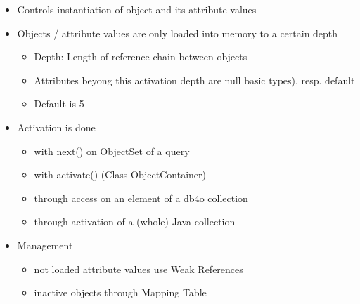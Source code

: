 \begin{breakbox}
\begin{itemize}
	\item Controls instantiation of object and its attribute values
	\item Objects / attribute values are only loaded into memory to a certain depth
		\begin{itemize}
			\item Depth: Length of reference chain between objects
			\item Attributes beyong this activation depth are null basic types), resp. default
			\item Default is 5
		\end{itemize}
	\item Activation is done
		\begin{itemize}
			\item with next() on ObjectSet of a query
			\item with activate() (Class ObjectContainer)
			\item through access on an element of a db4o collection
			\item through activation of a (whole) Java collection
		\end{itemize}
	\item Management
		\begin{itemize}
			\item not loaded attribute values use Weak References
			\item inactive objects through Mapping Table
		\end{itemize}
\end{itemize}
\end{breakbox}
























